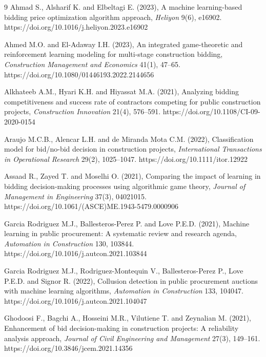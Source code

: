 \documentclass[twoside]{article}
\begin{document}
\begin{thebibliography}{9}
	Ahmad S., Alsharif K. and Elbeltagi E. (2023), A machine learning-based bidding price optimization algorithm approach, {\it Heliyon} 9(6), e16902. https://doi.org/10.1016/j.heliyon.2023.e16902
	
	Ahmed M.O. and El-Adaway I.H. (2023), An integrated game-theoretic and reinforcement learning modeling for multi-stage construction bidding, {\it Construction Management and Economics} 41(1), 47--65. https://doi.org/10.1080/01446193.2022.2144656
	
	Alkhateeb A.M., Hyari K.H. and Hiyassat M.A. (2021), Analyzing bidding competitiveness and success rate of contractors competing for public construction projects, {\it Construction Innovation} 21(4), 576--591. https://doi.org/10.1108/CI-09-2020-0154
	
	Araujo M.C.B., Alencar L.H. and de Miranda Mota C.M. (2022), Classification model for bid/no-bid decision in construction projects, {\it International Transactions in Operational Research} 29(2), 1025--1047. https://doi.org/10.1111/itor.12922
	
	Assaad R., Zayed T. and Moselhi O. (2021), Comparing the impact of learning in bidding decision-making processes using algorithmic game theory, {\it Journal of Management in Engineering} 37(3), 04021015. https://doi.org/10.1061/(ASCE)ME.1943-5479.0000906
	
	Garcia Rodriguez M.J., Ballesteros-Perez P. and Love P.E.D. (2021), Machine learning in public procurement: A systematic review and research agenda, {\it Automation in Construction} 130, 103844. https://doi.org/10.1016/j.autcon.2021.103844
	
	Garcia Rodriguez M.J., Rodriguez-Montequin V., Ballesteros-Perez P., Love P.E.D. and Signor R. (2022), Collusion detection in public procurement auctions with machine learning algorithms, {\it Automation in Construction} 133, 104047. https://doi.org/10.1016/j.autcon.2021.104047
	
	Ghodoosi F., Bagchi A., Hosseini M.R., Vilutiene T. and Zeynalian M. (2021), Enhancement of bid decision-making in construction projects: A reliability analysis approach, {\it Journal of Civil Engineering and Management} 27(3), 149--161. https://doi.org/10.3846/jcem.2021.14356
	

\end{thebibliography}
\end{document}
